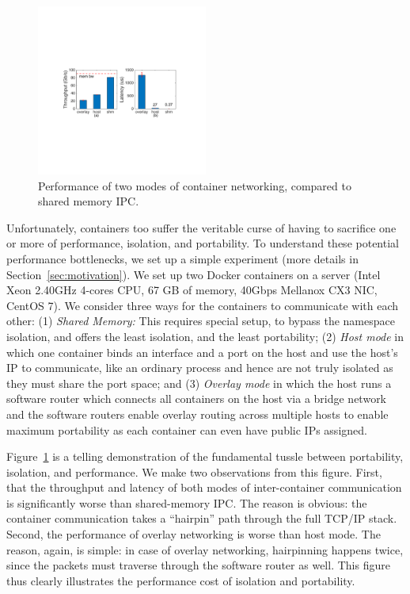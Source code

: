 \begin{figure}[th]
     \centering 
     \includegraphics[width=0.5\textwidth]{figures/intro/intro_exist2.pdf} 
     \caption{Performance of two modes of container networking, compared to
     shared memory IPC.} 
     \label{fig:three_modes} 
\end{figure} 

Unfortunately, containers too suffer the veritable curse of having to sacrifice
one or more of performance, isolation, and portability.  To understand these
potential performance bottlenecks, we set up a simple experiment (more details
in Section~\ref{sec:motivation}).  We set up two Docker containers on a server
(Intel Xeon 2.40GHz 4-cores CPU, 67 GB of memory, 40Gbps Mellanox CX3 NIC,
CentOS 7). We consider three ways for the containers to communicate with each
other: (1) {\em Shared Memory:} This requires special setup, to bypass the
namespace isolation, and offers the least isolation, and the least portability;
(2) {\em Host  mode} in which one container binds an interface and a port on the
host and use the host's IP to communicate, like an ordinary process and hence
are not truly isolated as they must share the port space; and (3)  {\em Overlay
mode} in which the host runs a software router which connects all containers on
the host via  a bridge network and the software routers enable overlay routing
across multiple hosts to enable maximum portability as  each container can even
have public IPs assigned.

Figure~\ref{fig:three_modes} is a telling demonstration of the fundamental
tussle between portability, isolation, and performance. We make two
observations from this figure. First, that the throughput and latency of both
modes of inter-container communication is significantly worse than
shared-memory IPC. The reason is obvious: the container communication takes a
``hairpin'' path through the full TCP/IP stack. Second, the performance of
overlay networking is worse than host mode. The reason, again, is simple: in
case of overlay networking, hairpinning happens twice, since the packets must
traverse through the software router as well. This figure thus clearly
illustrates the performance cost of isolation and portability.

